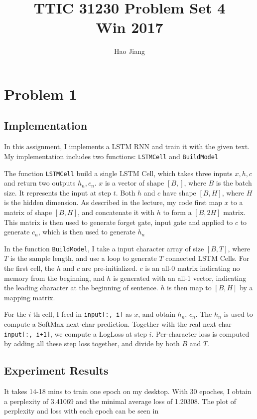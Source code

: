 \documentclass{article}
\title{TTIC 31230 Problem Set 4 \\ Win 2017}
\author{Hao Jiang}
\begin{document}
\maketitle

\section*{Problem 1}
\subsection*{Implementation}
In this assignment, I implements a LSTM RNN and train it with the given text. My
implementation includes two functions: \texttt{LSTMCell} and \texttt{BuildModel}

The function \texttt{LSTMCell} build a single LSTM Cell, which takes three
inputs $x,h,c$ and return two outputs $h_{n}, c_{n}$. $x$ is a
vector of shape $[B,]$, where $B$ is the batch size. It represents the input at
step $t$. Both $h$ and $c$ have shape $[B, H]$, where $H$ is the hidden
dimension. As described in the lecture, my code first map $x$ to a
matrix of shape $[B,H]$, and concatenate it with $h$ to form a $[B,2H]$
matrix. This matrix is then used to generate forget gate, input gate and applied
to $c$ to generate $c_{n}$, which is then used to generate $h_{n}$

In the function \texttt{BuildModel}, I take a input character array of size
$[B, T]$, where $T$ is the sample length, and use a loop to generate $T$
connected LSTM Cells. For the first cell, the $h$ and $c$ are pre-initialized.
$c$ is an all-0 matrix indicating no memory from the beginning, and $h$ is
generated with an all-1 vector, indicating the leading character at the
beginning of sentence. $h$ is then map to $[B, H]$ by a mapping matrix.

For the $i$-th cell, I feed in \texttt{input[:, i]} as $x$, and obtain $h_n$,
$c_n$. The $h_n$ is used to compute a SoftMax next-char prediction. Together
with the real next char \texttt{input[:, i+1]}, we compute a LogLoss at step
$i$. Per-character loss is computed by adding all these step loss together, and
divide by both $B$ and $T$.

\subsection*{Experiment Results}
It takes 14-18 mins to train one epoch on my desktop. With 30 epoches, I
obtain a perplexity of 3.41069 and the minimal average loss of 1.20308. The plot
of perplexity and loss with each epoch can be seen in 
\end{document}
